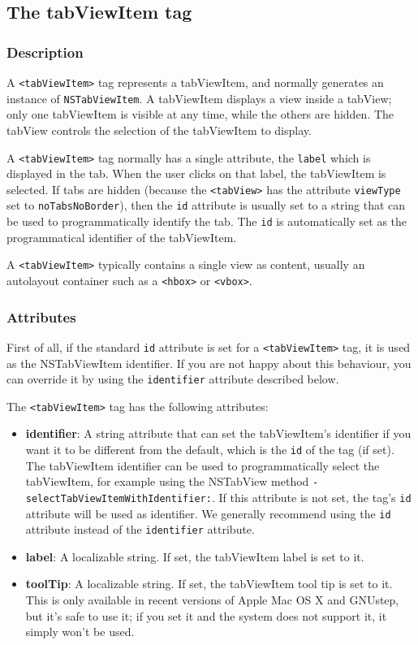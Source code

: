 \subsection{The tabViewItem tag}

\subsubsection{Description}

A \texttt{<tabViewItem>} tag represents a tabViewItem, and normally
generates an instance of \texttt{NSTabViewItem}.  A tabViewItem
displays a view inside a tabView; only one tabViewItem is visible at
any time, while the others are hidden.  The tabView controls the
selection of the tabViewItem to display.

A \texttt{<tabViewItem>} tag normally has a single attribute, the
\texttt{label} which is displayed in the tab.  When the user clicks on
that label, the tabViewItem is selected.  If tabs are hidden (because
the \texttt{<tabView>} has the attribute \texttt{viewType} set to
\texttt{noTabsNoBorder}), then the \texttt{id} attribute is usually
set to a string that can be used to programmatically identify the tab.
The \texttt{id} is automatically set as the programmatical identifier
of the tabViewItem.

A \texttt{<tabViewItem>} typically contains a single view as content,
usually an autolayout container such as a \texttt{<hbox>} or
\texttt{<vbox>}.

\subsubsection{Attributes}
First of all, if the standard \texttt{id} attribute is set for a
\texttt{<tabViewItem>} tag, it is used as the NSTabViewItem
identifier.  If you are not happy about this behaviour, you can
override it by using the \texttt{identifier} attribute described
below.

The \texttt{<tabViewItem>} tag has the following attributes:
\begin{itemize}
\item {\bf identifier}: A string attribute that can set the
  tabViewItem's identifier if you want it to be different from the
  default, which is the \texttt{id} of the tag (if set).  The
  tabViewItem identifier can be used to programmatically select the
  tabViewItem, for example using the NSTabView method
  \texttt{-selectTabViewItemWithIdentifier:}.  If this attribute is
  not set, the tag's \texttt{id} attribute will be used as identifier.
  We generally recommend using the \texttt{id} attribute instead of
  the \texttt{identifier} attribute.
\item {\bf label}: A localizable string.  If set, the tabViewItem
  label is set to it.
\item {\bf toolTip}: A localizable string.  If set, the tabViewItem
  tool tip is set to it.  This is only available in recent versions of
  Apple Mac OS X and GNUstep, but it's safe to use it; if you set it
  and the system does not support it, it simply won't be used.
\end{itemize}

